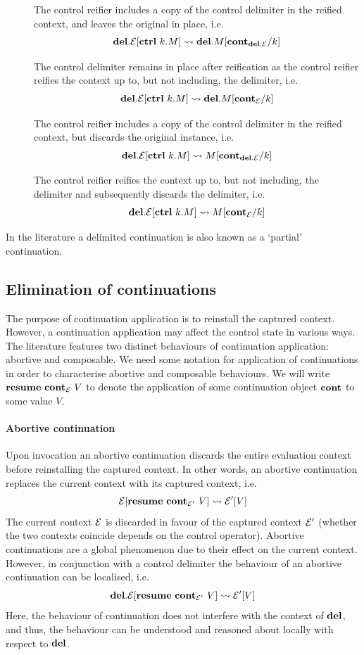 \documentclass[12pt,phd,lfcs,twoside,openright,logo,leftchapter,normalheadings]{infthesis}
\theoremstyle{plain}
\theoremstyle{definition}
\begin{document}
\begin{description}
\item[\CCpp] The control reifier includes a copy of the control delimiter in the
  reified context, and leaves the original in place, i.e.
\[
  \mathbf{del}.\mathcal{E}[\mathbf{ctrl}~k.M] \leadsto \mathbf{del}.M[\mathbf{cont}_{\mathbf{del}.\mathcal{E}}/k]
\]
\item[\CCpm] The control delimiter remains in place after
  reification as the control reifier reifies the context up to, but
  not including, the delimiter, i.e.
  \[
    \mathbf{del}.\mathcal{E}[\mathbf{ctrl}~k.M] \leadsto \mathbf{del}.M[\mathbf{cont}_{\mathcal{E}}/k]
  \]
\item[\CCmp] The control reifier includes a copy of the control
  delimiter in the reified context, but discards the original
  instance, i.e.
  \[
    \mathbf{del}.\mathcal{E}[\mathbf{ctrl}~k.M] \leadsto M[\mathbf{cont}_{\mathbf{del}.\mathcal{E}}/k]
  \]
\item[\CCmm] The control reifier reifies the context up to, but not
  including, the delimiter and subsequently discards the delimiter, i.e.
  \[
    \mathbf{del}.\mathcal{E}[\mathbf{ctrl}~k.M] \leadsto M[\mathbf{cont}_{\mathcal{E}}/k]
  \]
\end{description}




%
In the literature a delimited continuation is also known as a
`partial' continuation.

\subsection{Elimination of continuations}

The purpose of continuation application is to reinstall the captured
context.
%
However, a continuation application may affect the control state in
various ways. The literature features two distinct behaviours of
continuation application: abortive and composable. We need some
notation for application of continuations in order to characterise
abortive and composable behaviours. We will write
$\mathbf{resume}~\mathbf{cont}_{\mathcal{E}}~V$ to denote the application of some
continuation object $\mathbf{cont}$ to some value $V$.

\paragraph{Abortive continuation} Upon invocation an abortive
continuation discards the entire evaluation context before
reinstalling the captured context. In other words, an abortive
continuation replaces the current context with its captured context,
i.e.
%
\[
  \mathcal{E}[\mathbf{resume}~\mathbf{cont}_{\mathcal{E}'}~V] \leadsto \mathcal{E}'[V]
\]
%
The current context $\mathcal{E}$ is discarded in favour of the captured
context $\mathcal{E}'$ (whether the two contexts coincide depends on the
control operator).  Abortive continuations are a global phenomenon due
to their effect on the current context. However, in conjunction with a
control delimiter the behaviour of an abortive continuation can be
localised, i.e.
%
\[
  \mathbf{del}.\mathcal{E}[\mathbf{resume}~\mathbf{cont}_{\mathcal{E}'}~V] \leadsto \mathcal{E}'[V]
\]
%
Here, the behaviour of continuation does not interfere with the
context of $\mathbf{del}$, and thus, the behaviour can be understood and
reasoned about locally with respect to $\mathbf{del}$.
\end{document}
